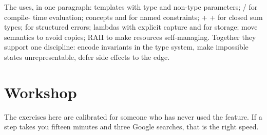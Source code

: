 \begin{recap}
The \cpp{} \maya{} uses, in one paragraph: templates with type and
non-type parameters; / for compile-
time evaluation; concepts and  for named constraints;
 +  +  for closed
sum types;  for structured errors; lambdas with
explicit capture and  for storage;
move semantics to avoid copies; RAII to make resources self-managing.
Together they support one discipline: encode invariants in the type
system, make impossible states unrepresentable, defer side effects to
the edge.
\end{recap}

\section*{Workshop}

The exercises here are calibrated for someone who has never used the
feature. If a step takes you fifteen minutes and three Google
searches, that is the right speed.

